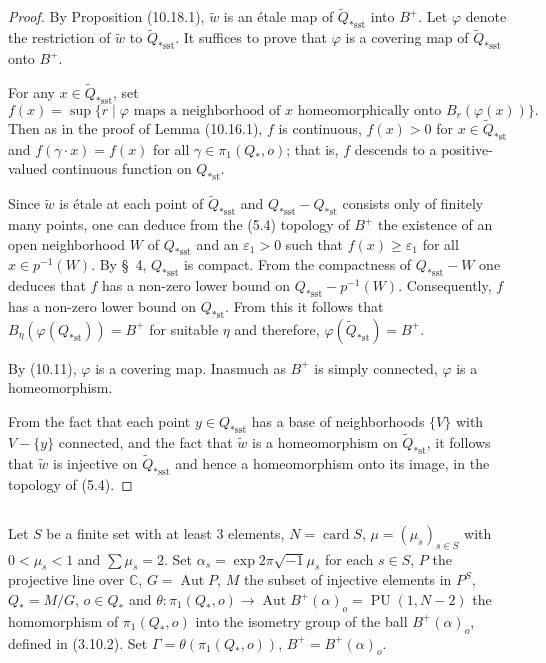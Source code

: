 \documentclass[12pt,a4paper]{article}
\theoremstyle{plain}
\theoremstyle{definition}
\theoremstyle{remark}
\DeclareMathOperator{\Aut}{Aut}
\DeclareMathOperator{\card}{card}
\DeclareMathOperator{\PU}{PU}
\begin{document}
\begin{proof}
By Proposition (10.18.1), $\widetilde{w}$ is an \'etale map of $\widetilde{Q}_{*\text{sst}}$ into $B^+$. Let $\varphi$ denote the restriction of $\widetilde{w}$ to $\widetilde{Q}_{*\text{sst}}$. It suffices to prove that $\varphi$ is a covering map of $\widetilde{Q}_{*\text{sst}}$ onto $B^+$.

For any $x \in \widetilde{Q}_{*\text{sst}}$, set
\[
f(x) = \sup \{r \mid \varphi \text{ maps a neighborhood of } x \text{ homeomorphically onto } B_r(\varphi(x))\}.
\]
Then as in the proof of Lemma (10.16.1), $f$ is continuous, $f(x) > 0$ for $x \in \widetilde{Q}_{*\text{st}}$ and $f(\gamma \cdot x) = f(x)$ for all $\gamma \in \pi_1(Q_*, o)$; that is, $f$ descends to a positive-valued continuous function on $Q_{*\text{st}}$.

Since $\widetilde{w}$ is \'etale at each point of $\widetilde{Q}_{*\text{sst}}$ and $Q_{*\text{sst}} - Q_{*\text{st}}$ consists only of finitely many points, one can deduce from the (5.4) topology of $B^+$ the existence of an open neighborhood $W$ of $Q_{*\text{sst}}$ and an $\varepsilon_1 > 0$ such that $f(x) \geqslant \varepsilon_1$ for all $x \in p^{-1}(W)$. By \S\ 4, $Q_{*\text{sst}}$ is compact. From the compactness of $Q_{*\text{sst}} - W$ one deduces that $f$ has a non-zero lower bound on $Q_{*\text{sst}} - p^{-1}(W)$. Consequently, $f$ has a non-zero lower bound on $Q_{*\text{st}}$. From this it follows that $B_\eta(\varphi(Q_{*\text{st}})) = B^+$ for suitable $\eta$ and therefore, $\varphi(\widetilde{Q}_{*\text{st}}) = B^+$.

By (10.11), $\varphi$ is a covering map. Inasmuch as $B^+$ is simply connected, $\varphi$ is a homeomorphism.

From the fact that each point $y \in Q_{*\text{sst}}$ has a base of neighborhoods $\{V\}$ with $V - \{y\}$ connected, and the fact that $\widetilde{w}$ is a homeomorphism on $\widetilde{Q}_{*\text{st}}$, it follows that $\widetilde{w}$ is injective on $\widetilde{Q}_{*\text{sst}}$ and hence a homeomorphism onto its image, in the topology of (5.4).
\end{proof}

\subsection{}
\label{10.19}

Let $S$ be a finite set with at least $3$ elements, $N = \card S$, $\mu = (\mu_s)_{s \in S}$ with $0 < \mu_s < 1$ and $\sum \mu_s = 2$. Set $\alpha_s = \exp 2\pi\sqrt{-1}\mu_s$ for each $s \in S$, $P$ the projective line over $\mathbb{C}$, $G = \Aut P$, $M$ the subset of injective elements in $P^S$, $Q_* = M/G$, $o \in Q_*$ and $\theta : \pi_1(Q_*, o) \to \Aut B^+(\alpha)_o = \PU(1, N - 2)$ the homomorphism of $\pi_1(Q_*, o)$ into the isometry group of the ball $B^+(\alpha)_o$, defined in (3.10.2). Set $\Gamma = \theta(\pi_1(Q_*, o))$, $B^+ = B^+(\alpha)_o$.
\end{document}
